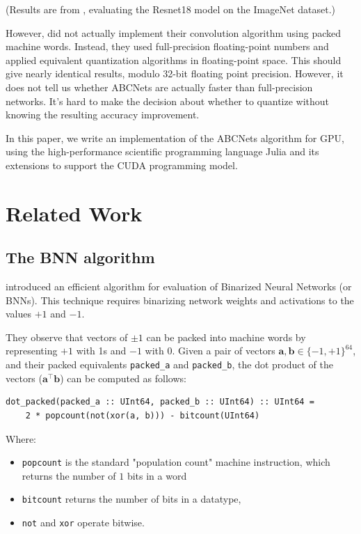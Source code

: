 \documentclass[12pt]{article}
\newcommand{\av}[0]{\mathbf{a}}
\newcommand{\bv}[0]{\mathbf{b}}
\newcommand{\transpose}[1]{#1 ^\top}
\newcommand{\dotp}[2]{\transpose{#1} #2}
\begin{document}
(Results are from \citet{ABCNets}, evaluating the Resnet18 model on the ImageNet dataset.)

However, \citet{ABCNets} did not actually implement their convolution algorithm using packed machine words. Instead, they used full-precision floating-point numbers and applied equivalent quantization algorithms in floating-point space. This should give nearly identical results, modulo 32-bit floating point precision. However, it does not tell us whether ABCNets are actually faster than full-precision networks. It's hard to make the decision about whether to quantize without knowing the resulting accuracy improvement.

In this paper, we write an implementation of the ABCNets algorithm for GPU, using the high-performance scientific programming language Julia and its extensions to support the CUDA programming model.

\section{Related Work}
\label{sec:org0de2562}
\subsection{The BNN algorithm}
\label{sec:org7d3d87d}
\citet{BinarizedNeuralNetworks} introduced an efficient algorithm for evaluation of Binarized Neural Networks (or BNNs). This technique requires binarizing network weights and activations to the values \(+1\) and \(-1\).

They observe that vectors of \(\pm 1\) can be packed into machine words by representing \(+1\) with 1s and \(-1\) with 0.
Given a pair of vectors \(\av, \bv \in \{-1,+1\}^{64}\), and their packed equivalents \texttt{packed\_a} and \texttt{packed\_b}, the dot product of the vectors (\(\dotp{\av}{\bv}\)) can be computed as follows:
\begin{verbatim}
dot_packed(packed_a :: UInt64, packed_b :: UInt64) :: UInt64 =
    2 * popcount(not(xor(a, b))) - bitcount(UInt64)
\end{verbatim}
Where:
\begin{itemize}
\item \texttt{popcount} is the standard "population count" machine instruction, which returns the number of \(1\) bits in a word
\item \texttt{bitcount} returns the number of bits in a datatype,
\item \texttt{not} and \texttt{xor} operate bitwise.
\end{itemize}
\end{document}

